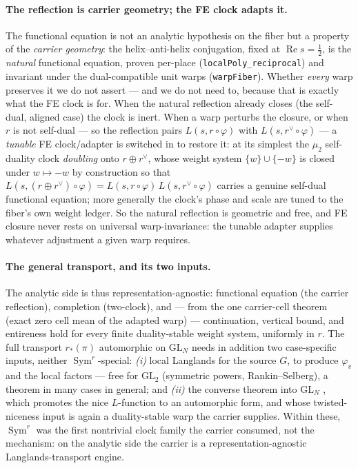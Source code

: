 \documentclass[11pt]{article}
\theoremstyle{definition}
\renewcommand{\Re}{\operatorname{Re}}
\newcommand{\Sym}{\operatorname{Sym}}
\begin{document}
\paragraph{The reflection is carrier geometry; the FE clock adapts it.} The functional equation is not an
analytic hypothesis on the fiber but a property of the \emph{carrier geometry}: the helix--anti-helix
conjugation, fixed at $\Re s=\tfrac12$, is the \emph{natural} functional equation, proven per-place
(\texttt{localPoly\_reciprocal}) and invariant under the dual-compatible unit warps (\texttt{warpFiber}).
Whether \emph{every} warp preserves it we do not assert --- and we do not need to, because that is exactly
what the FE clock is for. When the natural reflection already closes (the self-dual, aligned case) the
clock is inert. When a warp perturbs the closure, or when $r$ is not self-dual --- so the reflection pairs
$L(s,r\circ\varphi)$ with $L(s,r^\vee\circ\varphi)$ --- a \emph{tunable} FE clock/adapter is switched in to
restore it: at its simplest the $\mu_2$ self-duality clock \emph{doubling} onto $r\oplus r^\vee$, whose
weight system $\{w\}\cup\{-w\}$ is closed under $w\mapsto-w$ by construction so that
$L(s,(r\oplus r^\vee)\circ\varphi)=L(s,r\circ\varphi)\,L(s,r^\vee\circ\varphi)$ carries a genuine self-dual
functional equation; more generally the clock's phase and scale are tuned to the fiber's own weight ledger.
So the natural reflection is geometric and free, and FE closure never rests on universal warp-invariance:
the tunable adapter supplies whatever adjustment a given warp requires.

\paragraph{The general transport, and its two inputs.} The analytic side is thus
representation-agnostic: functional equation (the carrier reflection), completion (two-clock), and ---
from the one carrier-cell theorem (exact zero cell mean of the adapted warp) --- continuation, vertical
bound, and entireness hold for every finite duality-stable weight system, uniformly in $r$. The full transport $r_*(\pi)$ automorphic on
$\mathrm{GL}_N$ needs in addition two case-specific inputs, neither $\Sym^r$-special: \emph{(i)} local
Langlands for the source $G$, to produce $\varphi_v$ and the local factors --- free for $\mathrm{GL}_2$
(symmetric powers, Rankin--Selberg), a theorem in many cases in general; and \emph{(ii)} the converse
theorem into $\mathrm{GL}_N$ \cite{CPS}, which promotes the nice $L$-function to an automorphic form, and
whose twisted-niceness input is again a duality-stable warp the carrier supplies. Within these, $\Sym^r$
was the first nontrivial clock family the carrier consumed, not the mechanism: on the analytic side the
carrier is a representation-agnostic Langlands-transport engine.
\end{document}

